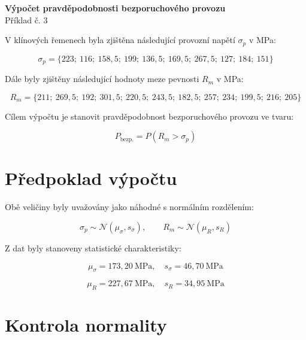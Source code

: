 %
{}%
%


\begin{center}
	{\Large \textbf{Výpočet pravděpodobnosti bezporuchového provozu}}\\[-1mm]
	{\small Příklad č. 3}
\end{center}



V klínových řemenech byla zjištěna následující provozní napětí $\sigma_p$ v MPa:

\[
\sigma_p =
\{223;\ 116;\ 158{,}5;\ 199;\ 136{,}5;\ 169{,}5;\ 267{,}5;\ 127;\ 184;\ 151\}
\]


\noindent
Dále byly zjištěny následující hodnoty meze pevnosti $R_m$ v MPa:

\[
R_m =
\{211;\ 269{,}5;\ 192;\ 301{,}5;\ 220{,}5;\ 243{,}5;\ 182{,}5;\ 257;\ 234;\ 199{,}5;\ 216;\ 205\}
\]

Cílem výpočtu je stanovit pravděpodobnost bezporuchového provozu ve tvaru:

\begin{equation}
P_{\text{bezp.}} = P(R_m > \sigma_p)
\label{eq:pravd}
\end{equation}

\section*{Předpoklad výpočtu}

Obě veličiny byly uvažovány jako náhodné s normálním rozdělením:

\begin{equation}
\sigma_p \sim \mathcal{N}(\mu_{\sigma}, s_{\sigma}), \qquad
R_m \sim \mathcal{N}(\mu_R, s_R)
\label{eq:normalita}
\end{equation}


\noindent
Z dat byly stanoveny statistické charakteristiky:

\[
\mu_{\sigma} = 173{,}20\ \text{MPa}, \quad
s_{\sigma} = 46{,}70\ \text{MPa}
\]

\[
\mu_R = 227{,}67\ \text{MPa}, \quad
s_R = 34{,}95\ \text{MPa}
\]

\section*{Kontrola normality}

